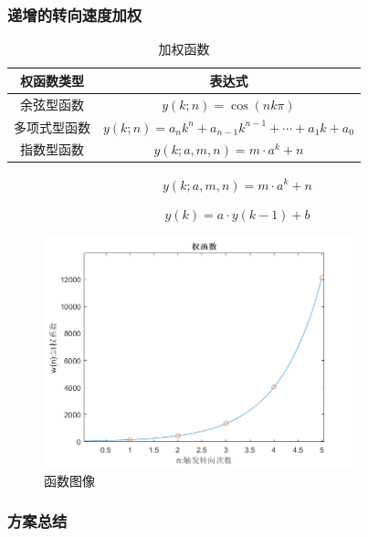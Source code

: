 \documentclass[a4paper,twoside,zihao=5,UTF8]{ctexart}
\begin{document}
\begin{spacing}{1.2}
\subsubsection{递增的转向速度加权}

\begin{table}[htb]
	\centering
	\caption{加权函数}
	\label{tbl:weight}
	\renewcommand\arraystretch{1.5}
	\begin{tabular}{c|c}
		\toprule
		\hline
		权函数类型 & 表达式 \\
		\hline
		余弦型函数 & $y(k;n)=\cos(nk\pi)$ \\
		\hline
		多项式型函数 & $y(k;n)=a_nk^n+a_{n-1}k^{n-1}+\cdots+a_1k+a_0$ \\
		\hline
		指数型函数 & $y(k;a,m,n)=m\cdot a^k+n$ \\
		\hline
		\bottomrule
	\end{tabular}
\end{table}

\begin{equation}
	\begin{aligned}
		y(k;a,m,n)=m\cdot a^k+n
	\end{aligned}
\end{equation}

\begin{equation}
	y(k)=a\cdot y(k-1)+b
\end{equation}

\begin{figure}
	\centering
	\caption{函数图像}
	\label{fig:weight}
	\includegraphics[width=0.8\textwidth]{weight.png}
\end{figure}

\subsubsection{方案总结}


\end{spacing}
\end{document}
